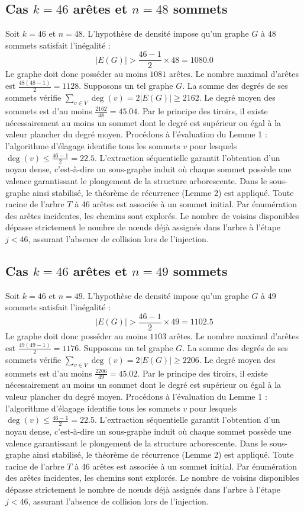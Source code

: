\documentclass[12pt,a4paper]{article}
\begin{document}
\subsection{Cas $k = 46$ arêtes et $n = 48$ sommets}
Soit $k = 46$ et $n = 48$. L'hypothèse de densité impose qu'un graphe $G$ à 48 sommets satisfait l'inégalité :
$$ |E(G)| > \frac{46-1}{2} \times 48 = 1080.0 $$
Le graphe doit donc posséder au moins $1081$ arêtes. Le nombre maximal d'arêtes est $\frac{48(48-1)}{2} = 1128$.
Supposons un tel graphe $G$. La somme des degrés de ses sommets vérifie $\sum_{v \in V} \deg(v) = 2|E(G)| \geq 2162$.
Le degré moyen des sommets est d'au moins $\frac{2162}{48} = 45.04$.
Par le principe des tiroirs, il existe nécessairement au moins un sommet dont le degré est supérieur ou égal à la valeur plancher du degré moyen.
Procédons à l'évaluation du Lemme 1 : l'algorithme d'élagage identifie tous les sommets $v$ pour lesquels $\deg(v) \leq \frac{46-1}{2} = 22.5$.
L'extraction séquentielle garantit l'obtention d'un noyau dense, c'est-à-dire un sous-graphe induit où chaque sommet possède une valence garantissant le plongement de la structure arborescente.
Dans le sous-graphe ainsi stabilisé, le théorème de récurrence (Lemme 2) est appliqué. Toute racine de l'arbre $T$ à 46 arêtes est associée à un sommet initial. Par énumération des arêtes incidentes, les chemins sont explorés. Le nombre de voisins disponibles dépasse strictement le nombre de nœuds déjà assignés dans l'arbre à l'étape $j < 46$, assurant l'absence de collision lors de l'injection.

\subsection{Cas $k = 46$ arêtes et $n = 49$ sommets}
Soit $k = 46$ et $n = 49$. L'hypothèse de densité impose qu'un graphe $G$ à 49 sommets satisfait l'inégalité :
$$ |E(G)| > \frac{46-1}{2} \times 49 = 1102.5 $$
Le graphe doit donc posséder au moins $1103$ arêtes. Le nombre maximal d'arêtes est $\frac{49(49-1)}{2} = 1176$.
Supposons un tel graphe $G$. La somme des degrés de ses sommets vérifie $\sum_{v \in V} \deg(v) = 2|E(G)| \geq 2206$.
Le degré moyen des sommets est d'au moins $\frac{2206}{49} = 45.02$.
Par le principe des tiroirs, il existe nécessairement au moins un sommet dont le degré est supérieur ou égal à la valeur plancher du degré moyen.
Procédons à l'évaluation du Lemme 1 : l'algorithme d'élagage identifie tous les sommets $v$ pour lesquels $\deg(v) \leq \frac{46-1}{2} = 22.5$.
L'extraction séquentielle garantit l'obtention d'un noyau dense, c'est-à-dire un sous-graphe induit où chaque sommet possède une valence garantissant le plongement de la structure arborescente.
Dans le sous-graphe ainsi stabilisé, le théorème de récurrence (Lemme 2) est appliqué. Toute racine de l'arbre $T$ à 46 arêtes est associée à un sommet initial. Par énumération des arêtes incidentes, les chemins sont explorés. Le nombre de voisins disponibles dépasse strictement le nombre de nœuds déjà assignés dans l'arbre à l'étape $j < 46$, assurant l'absence de collision lors de l'injection.
\end{document}
